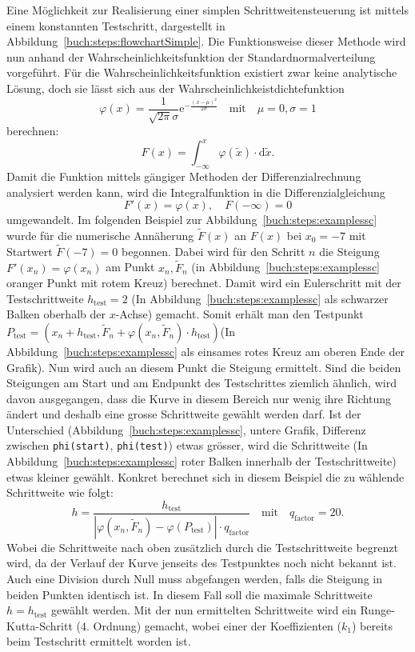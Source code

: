 Eine Möglichkeit zur Realisierung einer simplen Schrittweitensteuerung ist mittels einem konstannten Testschritt,
dargestellt in Abbildung~\ref{buch:steps:flowchartSimple}.
Die Funktionsweise dieser Methode wird nun anhand der Wahrscheinlichkeitsfunktion der Standardnormalverteilung vorgeführt.
Für die Wahrscheinlichkeitsfunktion existiert zwar keine analytische Lösung,
doch sie lässt sich aus der Wahrscheinlichkeistdichtefunktion
\[
  \varphi(x)=\frac{1}{\sqrt{2\pi}\sigma}\mathrm{e}^{-\frac{(x-\mu)^2}{2 \sigma}}\quad \text{mit} \quad \mu=0,\sigma=1
\]
berechnen:
\[
  F(x)=\int_{-\infty}^{x} \varphi (\tilde{x}) \cdot \mathrm{d} \tilde{x}.
\]
Damit die Funktion mittels gängiger Methoden der Differenzialrechnung analysiert werden kann,
wird die Integralfunktion in die Differenzialgleichung
\[
  F'(x)=\varphi(x), \quad F(-\infty)=0
\]
umgewandelt.
Im folgenden Beispiel zur Abbildung~\ref{buch:steps:examplessc}
wurde für die numerische Annäherung $\tilde{F}(x)$ an $F(x)$ bei $x_0=-7$ mit Startwert $\tilde{F}(-7)=0$ begonnen.
Dabei wird für den Schritt $n$ die Steigung $F'(x_n)=\varphi(x_n)$ am Punkt $x_{n}, \tilde{F}_{n}$ (in Abbildung~\ref{buch:steps:examplessc} oranger Punkt mit rotem Kreuz) berechnet.
Damit wird ein Eulerschritt mit der Testschrittweite $h_\text{test}=2$ (In Abbildung~\ref{buch:steps:examplessc} als schwarzer Balken oberhalb der $x$-Achse) gemacht.
Somit erhält man den Testpunkt 
$P_\text{test}=(x_n+h_\text{test}, \tilde{F}_n+\varphi(x_n, \tilde{F}_n) \cdot h_\text{test})$(In Abbildung~\ref{buch:steps:examplessc} als einsames rotes Kreuz am oberen Ende der Grafik).
Nun wird auch an diesem Punkt die Steigung ermittelt.
Sind die beiden Steigungen am Start und am Endpunkt des Testschrittes ziemlich ähnlich, wird davon ausgegangen,
dass die Kurve in diesem Bereich nur wenig ihre Richtung ändert und deshalb eine grosse Schrittweite gewählt werden darf.
Ist der Unterschied (Abbildung~\ref{buch:steps:examplessc},
untere Grafik, Differenz zwischen \texttt{phi(start)}, \texttt{phi(test)}) etwas grösser,
wird die Schrittweite (In Abbildung~\ref{buch:steps:examplessc} roter Balken innerhalb der Testschrittweite) etwas kleiner gewählt.
Konkret berechnet sich in diesem Beispiel die zu wählende Schrittweite wie folgt:
\begin{equation}
  h=\frac{h_{\text{test}}}{|\varphi(x_n, \tilde{F}_n)-\varphi(P_{\text{test}})|\cdot q_{\text{factor}}}\quad \text{mit} \quad q_{\text{factor}}=20.
  \label{buch:steps:equationSimpleStepSize}
\end{equation}
Wobei die Schrittweite nach oben zusätzlich durch die Testschrittweite begrenzt wird,
da der Verlauf der Kurve jenseits des Testpunktes noch nicht bekannt ist.
Auch eine Division durch Null muss abgefangen werden, falls die Steigung in beiden Punkten identisch ist.
In diesem Fall soll die maximale Schrittweite $h=h_{\text{test}}$ gewählt werden.
Mit der nun ermittelten Schrittweite wird ein Runge-Kutta-Schritt (4. Ordnung) gemacht,
wobei einer der Koeffizienten ($k_1$) bereits beim Testschritt ermittelt worden ist.

